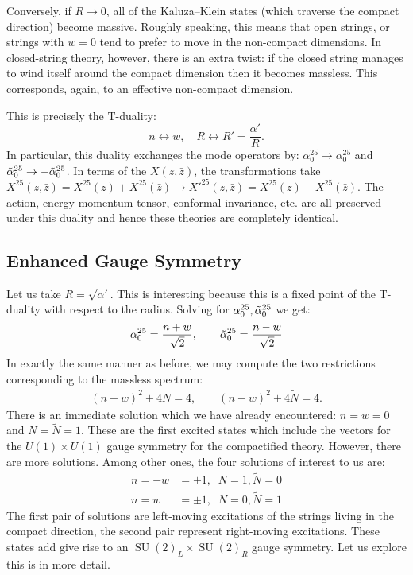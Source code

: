 \documentclass{report}
\theoremstyle{plain}
\theoremstyle{definition}
\theoremstyle{remark}
\newcommand{\FR}[2]{\frac{#1}{#2}}
\DeclareMathOperator{\SU}{SU}
\begin{document}
Conversely, if $R\to0$, all of the Kaluza--Klein states (which traverse the
compact direction) become massive. Roughly speaking, this means that open
strings, or strings with $w=0$ tend to prefer to move in the non-compact
dimensions. In closed-string theory, however, there is an extra twist: if
the closed string manages to wind itself around the compact dimension then
it becomes massless. This corresponds, again, to an effective non-compact
dimension.

This is precisely the T-duality: \[ n\leftrightarrow w, \quad R
\leftrightarrow R' = \FR{\alpha'}{R}.\] 
In particular, this duality exchanges the mode operators by:
$\alpha_0^{25}\to\alpha_0^{25}$ and $\tilde\alpha_0^{25}\to-\tilde\alpha_0^{25}$.
In terms of the $X(z,\bar z)$, the transformations take $X^{25}(z,\bar z)
=X^{25}(z) + X^{25}(\bar z) \to X'^{25}(z,\bar z) = X^{25}(z)-X^{25}(\bar
z)$. The action, energy-momentum tensor, conformal invariance, etc. are all
preserved under this duality and hence these theories are completely
identical.

\subsection{Enhanced Gauge Symmetry}
Let us take $R = \sqrt{\alpha'}$. This is interesting because this is a
fixed point of the T-duality with respect to the radius. Solving for
$\alpha_0^{25},\tilde\alpha_0^{25}$ we get:
\begin{align*}
\alpha_0^{25} =\FR{n+w}{\sqrt 2}, \qquad \talpha_0^{25} =
\FR{n-w}{\sqrt 2}
\end{align*}
In exactly the same manner as before, we may compute the two restrictions
corresponding to the massless spectrum:
\begin{align*}
    (n+w)^2+4N = 4, \qquad (n-w)^2+4\tilde N = 4.
\end{align*}
There is an immediate solution which we have already encountered: $n=w=0$
and $N=\tilde N = 1$. These are the first excited states which include the
vectors for the $U(1)\times U(1)$ gauge symmetry for the compactified
theory. However, there are more solutions. Among other ones, the four
solutions of interest to us are:
\begin{align*}
    n=-w&=\pm 1,\;\; N=1, \tilde N = 0\\
    n=w&=\pm 1, \;\; N=0, \tilde N = 1
\end{align*}
The first pair of solutions are left-moving excitations of the strings
living in the compact direction, the second pair represent right-moving
excitations. These states add give rise to an $\SU(2)_L\times \SU(2)_R$
gauge symmetry. Let us explore this is in more detail.
\end{document}
